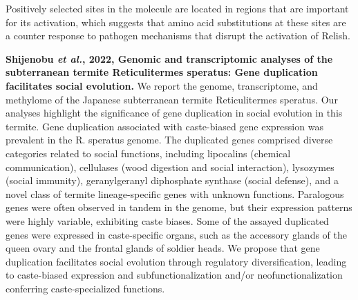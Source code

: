 \documentclass[11pt]{article}
\begin{document}
\begin{sloppypar}
Positively selected sites in the molecule are located in regions that are important for its activation, which suggests that amino acid substitutions at these sites are a counter response to pathogen mechanisms that disrupt the activation of Relish.
\par
\textbf{Shijenobu \textit{et al.}, 2022, Genomic and transcriptomic analyses of the subterranean termite Reticulitermes speratus: Gene duplication facilitates social evolution.} \newline
We report the genome, transcriptome, and methylome of the Japanese subterranean termite Reticulitermes speratus. 
Our analyses highlight the significance of gene duplication in social evolution in this termite. 
Gene duplication associated with caste-biased gene expression was prevalent in the R. speratus genome. 
The duplicated genes comprised diverse categories related to social functions, including lipocalins (chemical communication), cellulases (wood digestion and social interaction), lysozymes (social immunity), geranylgeranyl diphosphate synthase (social defense), and a novel class of termite lineage-specific genes with unknown functions. 
Paralogous genes were often observed in tandem in the genome, but their expression patterns were highly variable, exhibiting caste biases. 
Some of the assayed duplicated genes were expressed in caste-specific organs, such as the accessory glands of the queen ovary and the frontal glands of soldier heads. 
We propose that gene duplication facilitates social evolution through regulatory diversification, leading to caste-biased expression and subfunctionalization and/or neofunctionalization conferring caste-specialized functions.

\end{sloppypar}
\end{document}
